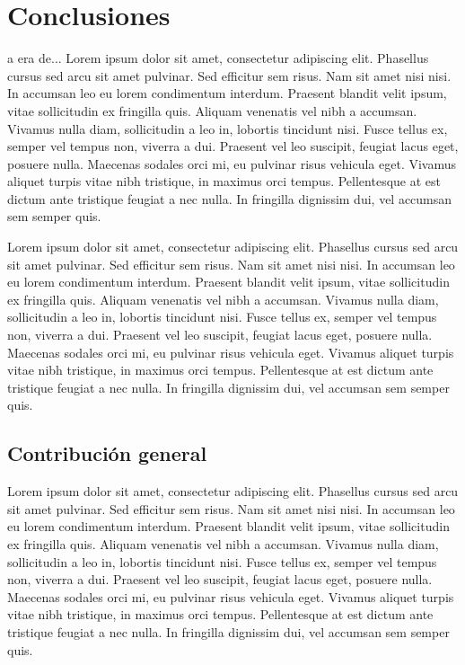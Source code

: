 \chapter{Conclusiones}
\label{chap:conclu}

a era de... Lorem ipsum dolor sit amet, consectetur adipiscing elit. Phasellus cursus sed arcu sit amet pulvinar. Sed efficitur sem risus. Nam sit amet nisi nisi. In accumsan leo eu lorem condimentum interdum. Praesent blandit velit ipsum, vitae sollicitudin ex fringilla quis. Aliquam venenatis vel nibh a accumsan. Vivamus nulla diam, sollicitudin a leo in, lobortis tincidunt nisi. Fusce tellus ex, semper vel tempus non, viverra a dui. Praesent vel leo suscipit, feugiat lacus eget, posuere nulla. Maecenas sodales orci mi, eu pulvinar risus vehicula eget. Vivamus aliquet turpis vitae nibh tristique, in maximus orci tempus. Pellentesque at est dictum ante tristique feugiat a nec nulla. In fringilla dignissim dui, vel accumsan sem semper quis.

Lorem ipsum dolor sit amet, consectetur adipiscing elit. Phasellus cursus sed arcu sit amet pulvinar. Sed efficitur sem risus. Nam sit amet nisi nisi. In accumsan leo eu lorem condimentum interdum. Praesent blandit velit ipsum, vitae sollicitudin ex fringilla quis. Aliquam venenatis vel nibh a accumsan. Vivamus nulla diam, sollicitudin a leo in, lobortis tincidunt nisi. Fusce tellus ex, semper vel tempus non, viverra a dui. Praesent vel leo suscipit, feugiat lacus eget, posuere nulla. Maecenas sodales orci mi, eu pulvinar risus vehicula eget. Vivamus aliquet turpis vitae nibh tristique, in maximus orci tempus. Pellentesque at est dictum ante tristique feugiat a nec nulla. In fringilla dignissim dui, vel accumsan sem semper quis.

\section{Contribución general}

Lorem ipsum dolor sit amet, consectetur adipiscing elit. Phasellus cursus sed arcu sit amet pulvinar. Sed efficitur sem risus. Nam sit amet nisi nisi. In accumsan leo eu lorem condimentum interdum. Praesent blandit velit ipsum, vitae sollicitudin ex fringilla quis. Aliquam venenatis vel nibh a accumsan. Vivamus nulla diam, sollicitudin a leo in, lobortis tincidunt nisi. Fusce tellus ex, semper vel tempus non, viverra a dui. Praesent vel leo suscipit, feugiat lacus eget, posuere nulla. Maecenas sodales orci mi, eu pulvinar risus vehicula eget. Vivamus aliquet turpis vitae nibh tristique, in maximus orci tempus. Pellentesque at est dictum ante tristique feugiat a nec nulla. In fringilla dignissim dui, vel accumsan sem semper quis.

